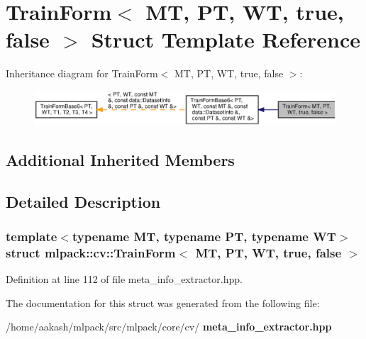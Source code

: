 \section{Train\+Form$<$ MT, PT, WT, true, false $>$ Struct Template Reference}
\label{structmlpack_1_1cv_1_1TrainForm_3_01MT_00_01PT_00_01WT_00_01true_00_01false_01_4}


Inheritance diagram for Train\+Form$<$ MT, PT, WT, true, false $>$\+:
\nopagebreak
\begin{figure}[H]
\begin{center}
\leavevmode
\includegraphics[width=350pt]{structmlpack_1_1cv_1_1TrainForm_3_01MT_00_01PT_00_01WT_00_01true_00_01false_01_4__inherit__graph}
\end{center}
\end{figure}
\subsection*{Additional Inherited Members}


\subsection{Detailed Description}
\subsubsection*{template$<$typename MT, typename PT, typename WT$>$\newline
struct mlpack\+::cv\+::\+Train\+Form$<$ M\+T, P\+T, W\+T, true, false $>$}



Definition at line 112 of file meta\+\_\+info\+\_\+extractor.\+hpp.



The documentation for this struct was generated from the following file\+:\begin{DoxyCompactItemize}
\item 
/home/aakash/mlpack/src/mlpack/core/cv/\textbf{ meta\+\_\+info\+\_\+extractor.\+hpp}\end{DoxyCompactItemize}
